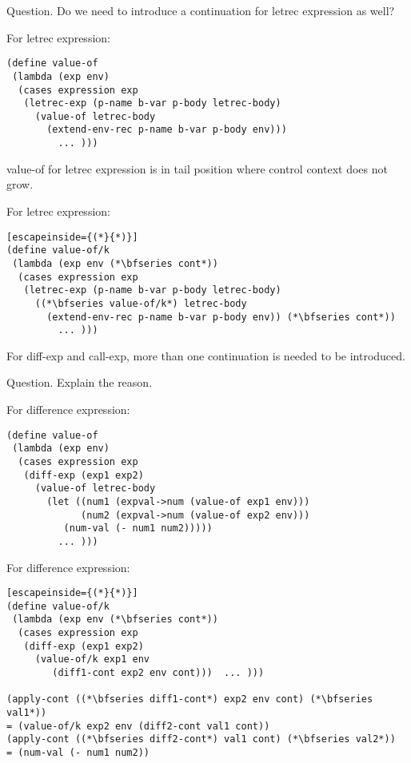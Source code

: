 \documentclass{article}
\begin{document}
\begin{huge}
Question. Do we need to introduce a continuation for letrec expression as well?

For letrec expression:
\begin{lstlisting}
(define value-of
 (lambda (exp env) 
  (cases expression exp 
   (letrec-exp (p-name b-var p-body letrec-body) 
     (value-of letrec-body
       (extend-env-rec p-name b-var p-body env)))
         ... )))
\end{lstlisting}


value-of for letrec expression is in tail position where control context does not grow.

For letrec expression:
\begin{lstlisting}[escapeinside={(*}{*)}]
(define value-of/k
 (lambda (exp env (*\bfseries cont*)) 
  (cases expression exp 
   (letrec-exp (p-name b-var p-body letrec-body) 
     ((*\bfseries value-of/k*) letrec-body
       (extend-env-rec p-name b-var p-body env)) (*\bfseries cont*))
         ... )))
\end{lstlisting}

For diff-exp and call-exp, more than one continuation is needed to be introduced.

Question. Explain the reason.

For difference expression:
\begin{lstlisting}
(define value-of
 (lambda (exp env) 
  (cases expression exp 
   (diff-exp (exp1 exp2) 
     (value-of letrec-body
       (let ((num1 (expval->num (value-of exp1 env))) 
             (num2 (expval->num (value-of exp2 env))) 
          (num-val (- num1 num2)))))
         ... )))
\end{lstlisting}

For difference expression:

\begin{lstlisting}[escapeinside={(*}{*)}]
(define value-of/k
 (lambda (exp env (*\bfseries cont*)) 
  (cases expression exp 
   (diff-exp (exp1 exp2) 
     (value-of/k exp1 env 
        (diff1-cont exp2 env cont)))  ... )))
         
(apply-cont ((*\bfseries diff1-cont*) exp2 env cont) (*\bfseries val1*))
= (value-of/k exp2 env (diff2-cont val1 cont))         
(apply-cont ((*\bfseries diff2-cont*) val1 cont) (*\bfseries val2*))
= (num-val (- num1 num2))  
\end{lstlisting}
  

\end{huge}
\end{document}
